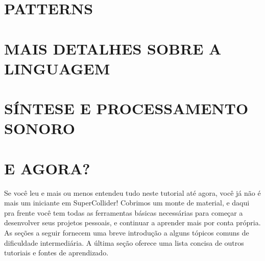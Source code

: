\documentclass[11pt]{article}
\begin{document}
\part{PATTERNS}



\newpage
\part{MAIS DETALHES SOBRE A LINGUAGEM}








\newpage
\part{SÍNTESE E PROCESSAMENTO SONORO}



















\newpage
\part{E AGORA?}
Se você leu e mais ou menos entendeu tudo neste tutorial até agora, você já não é mais um iniciante em SuperCollider! Cobrimos um monte de material, e daqui pra frente você tem todas as ferramentas básicas necessárias para começar a desenvolver seus projetos pessoais, e continuar a aprender mais por conta própria. As seções a seguir fornecem uma breve introdução a alguns tópicos comuns de dificuldade intermediária. A última seção oferece uma lista concisa de outros tutoriais e fontes de aprendizado.






\newpage
\theendnotes

\end{document}
